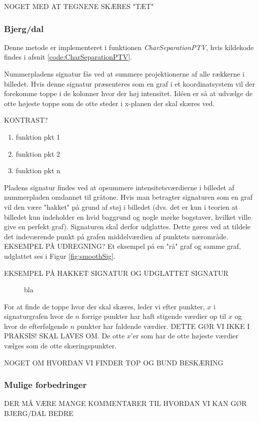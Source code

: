 NOGET MED AT TEGNENE SKÆRES "TÆT"	

\subsubsection*{Bjerg/dal}

Denne metode er implementeret i funktionen \textit{CharSeparationPTV}, hvis kildekode findes i afsnit \vref{code:CharSeparationPTV}.


Nummerpladens signatur fås ved at summere projektionerne af alle rækkerne i billedet. Hvis denne signatur præsenteres som en graf i et koordinatsystem vil der forekomme toppe i de kolonner hvor der høj intensitet. Idéen er så at udvælge de otte højeste toppe som de otte steder i x-planen der skal skæres ved.

KONTRAST?

\begin{enumerate}
\item funktion pkt 1
\item funktion pkt 2
\item funktion pkt n
\end{enumerate}

Pladens signatur findes ved at opsummere intensitetsværdierne i billedet af nummerpladen omdannet til gråtone. Hvis man betragter signaturen som en graf vil den være "hakket" på grund af støj i billedet (dvs. det er kun i teorien at billedet kun indeholder en hvid baggrund og nogle mørke bogstaver, hvilket ville give en perfekt graf). Signaturen skal derfor udglattes. Dette gøres ved at tildele det indeværende punkt på grafen middelværdien af punktets nærområde. EKSEMPEL PÅ UDREGNING? Et eksempel på en "rå" graf og samme graf, udglattet ses i Figur \vref{fig:smoothSig}.

EKSEMPEL PÅ HAKKET SIGNATUR OG UDGLATTET SIGNATUR

\begin{figure}[htp]
\label{fig:smoothSig}
\caption{bla}
\end{figure}

For at finde de toppe hvor der skal skæres, leder vi efter punkter, $x$ i signaturgrafen hvor de $n$ forrige punkter har haft stigende værdier op til $x$ og hvor de efterfølgende $n$ punkter har faldende værdier. DETTE GØR VI IKKE I PRAKSIS! SKAL LAVES OM. De otte $x$'er som har de otte højeste værdier vælges som de otte skæringspunkter.

NOGET OM HVORDAN VI FINDER TOP OG BUND BESKÆRING


\subsubsection{Mulige forbedringer}
DER MÅ VÆRE MANGE KOMMENTARER TIL HVORDAN VI KAN GØR BJERG/DAL BEDRE

